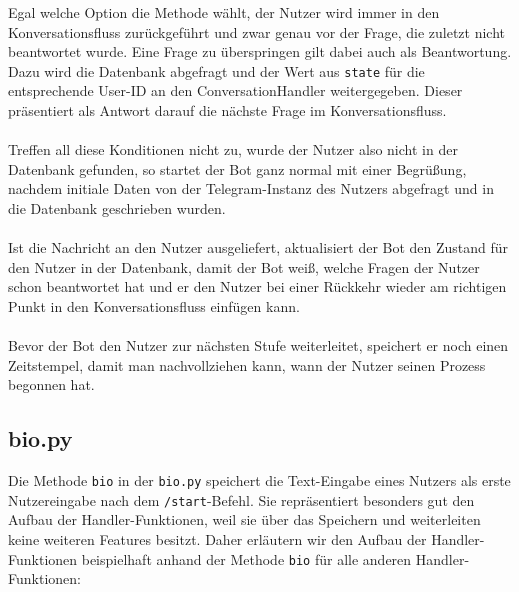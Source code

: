             Egal welche Option die Methode wählt, der Nutzer wird immer in den Konversationsfluss zurückgeführt und zwar genau vor der Frage, die zuletzt nicht beantwortet wurde. Eine Frage zu überspringen gilt dabei auch als Beantwortung. Dazu wird die Datenbank abgefragt und der Wert aus \verb|state| für die entsprechende User-ID an den ConversationHandler weitergegeben. Dieser präsentiert als Antwort darauf die nächste Frage im Konversationsfluss. \\
            \\
            Treffen all diese Konditionen nicht zu, wurde der Nutzer also nicht in der Datenbank gefunden, so startet der Bot ganz normal mit einer Begrüßung, nachdem initiale Daten von der Telegram-Instanz des Nutzers abgefragt und in die Datenbank geschrieben wurden. \\
            \\
            Ist die Nachricht an den Nutzer ausgeliefert, aktualisiert der Bot den Zustand für den Nutzer in der Datenbank, damit der Bot weiß, welche Fragen der Nutzer schon beantwortet hat und er den Nutzer bei einer Rückkehr wieder am richtigen Punkt in den Konversationsfluss einfügen kann.\\
            \\    
            Bevor der Bot den Nutzer zur nächsten Stufe weiterleitet, speichert er noch einen Zeitstempel, damit man nachvollziehen kann, wann der Nutzer seinen Prozess begonnen hat.


        \subsection{bio.py} \label{bio.py}
                Die Methode \verb|bio| in der \verb|bio.py| speichert die Text-Eingabe eines Nutzers als erste Nutzereingabe nach dem \verb|/start|-Befehl. Sie repräsentiert besonders gut den Aufbau der Handler-Funktionen, weil sie über das Speichern und weiterleiten keine weiteren Features besitzt. Daher erläutern wir den Aufbau der Handler-Funktionen beispielhaft anhand der Methode \verb|bio| für alle anderen Handler-Funktionen:

